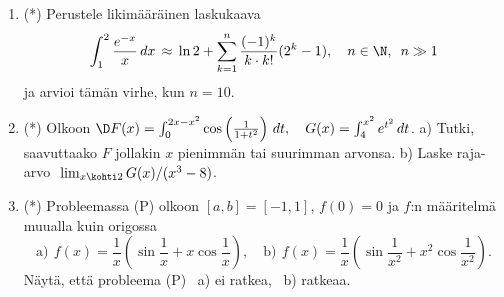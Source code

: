 \begin{enumerate}
\item (*)
Perustele likimääräinen laskukaava
\[
\int_1^2 \frac{e^{-x}}{x}\,dx \,\approx\, \ln 2+\sum_{k=1}^n \frac{(-1)^k}{k \cdot k!}(2^k-1),
                                          \quad n\in\N,\,\ n \gg 1
\]
ja arvioi tämän virhe, kun $n=10$.

\item (*) 
Olkoon $\D F(x)=\int_0^{2x-x^2} \cos\left(\frac{1}{1+t^2}\right)\,dt, \quad
           G(x)=\int_4^{x^2} e^{t^2}\,dt$. \vspace{2mm}\newline
a) Tutki, saavuttaako $F$ jollakin $x$ pienimmän tai suurimman arvonsa. \newline
b) Laske raja-arvo $\ \lim_{x \kohti 2} G(x)/(x^3-8)$.

\item (*)
Probleemassa (P) olkoon $[a,b]=[-1,1]$, $f(0)=0$ ja $f$:n määritelmä muualla kuin origossa
\[
\text{a)}\,\ f(x)=\frac{1}{x}\left(\sin\frac{1}{x}+x\cos\frac{1}{x}\right), \quad
\text{b)}\,\ f(x)=\frac{1}{x}\left(\sin\frac{1}{x^2}+x^2\cos\frac{1}{x^2}\right).
\]
Näytä, että probleema (P) \ a) ei ratkea, \ b) ratkeaa. 

\end{enumerate}